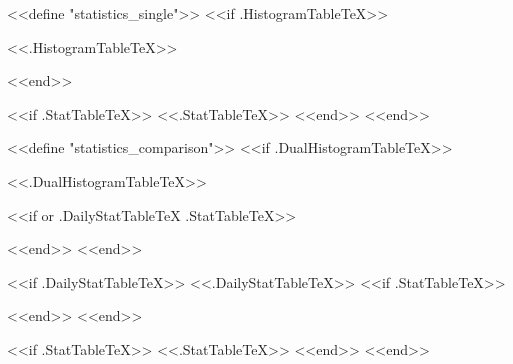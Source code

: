 <<define "statistics_single">>
<<if .HistogramTableTeX>>
\par\vspace{2pt}
\noindent\begin{minipage}{\linewidth}
\par\vspace{2pt}
<<.HistogramTableTeX>>
\end{minipage}
\par\vspace{0pt}
<<end>>

<<if .StatTableTeX>>
<<.StatTableTeX>>
<<end>>
<<end>>

<<define "statistics_comparison">>
<<if .DualHistogramTableTeX>>
\par\vspace{8pt}
\noindent\begin{minipage}{\linewidth}
\par\vspace{2pt}
<<.DualHistogramTableTeX>>
\end{minipage}
<<if or .DailyStatTableTeX .StatTableTeX>>
\par\vspace{2pt}
<<end>>
<<end>>

<<if .DailyStatTableTeX>>
<<.DailyStatTableTeX>>
<<if .StatTableTeX>>
\par\vspace{2pt}
<<end>>
<<end>>

<<if .StatTableTeX>>
<<.StatTableTeX>>
<<end>>
<<end>>
